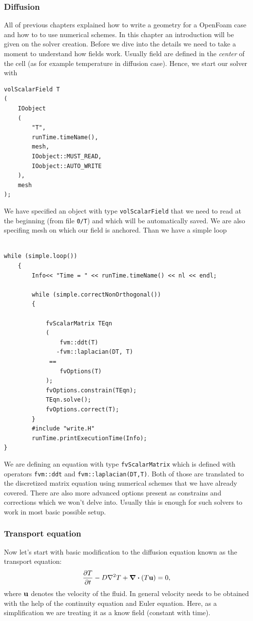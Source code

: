 \documentclass{article}
\begin{document}
\subsubsection{Diffusion}
All of previous chapters explained how to write a geometry for a OpenFoam case and how to to use numerical schemes. In this chapter 
an introduction will be given on the solver creation. Before we dive into the details we need to take a moment to understand how fields work. 
Usually field are defined in the {\it center} of the cell (as for example temperature in diffusion case). Hence, we start our solver with 
\begin{verbatim}
volScalarField T
(
    IOobject
    (
        "T",
        runTime.timeName(),
        mesh,
        IOobject::MUST_READ,
        IOobject::AUTO_WRITE
    ),
    mesh
);
\end{verbatim}
We have specified an object with type \texttt{volScalarField} that we need to read at the beginning (from file \texttt{0/T}) and which will be automatically saved.
We are also specifing mesh on which our field is anchored.
Than we have a simple loop 
\begin{verbatim}

while (simple.loop())
    {
        Info<< "Time = " << runTime.timeName() << nl << endl;

        while (simple.correctNonOrthogonal())
        {

            fvScalarMatrix TEqn
            (
                fvm::ddt(T)
               -fvm::laplacian(DT, T)
             ==
                fvOptions(T)
            );
            fvOptions.constrain(TEqn);
            TEqn.solve();
            fvOptions.correct(T);
        }
        #include "write.H"
        runTime.printExecutionTime(Info);
}
\end{verbatim}
We are defining an equation with type \texttt{fvScalarMatrix} which is defined with operators \texttt{fvm::ddt} and \texttt{fvm::laplacian(DT,T)}.
Both of those are translated to the discretized matrix equation using numerical schemes that we have already covered. There are also more 
advanced options present as constrains and corrections which we won't delve into. Usually this is enough for such solvers to work in most basic 
possible setup.

\subsubsection{Transport equation}
Now let's start with basic modification to the diffusion equation known as the transport equation:
\begin{equation*}
    \pdv{T}{t} - D \laplacian{T} + \div{(T\vb{u})} = 0,
\end{equation*}
where $\vb{u}$ denotes the velocity of the fluid. In general velocity needs to be obtained with the help of the 
continuity equation and Euler equation. Here, as a simplification we are treating it as a know field (constant with time).
\end{document}
